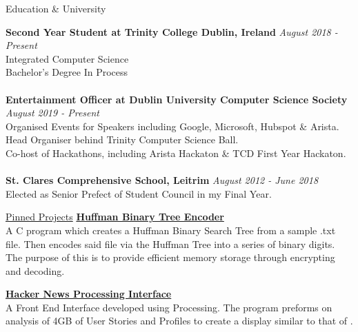 \documentclass{resume} %
\begin{document}

\begin{rSection}{Education \& University}

{\bf Second Year Student at Trinity College Dublin, Ireland} \hfill {\em August 2018 - Present}
\\ Integrated Computer Science
\\ Bachelor's Degree In Process\\
\\{\bf Entertainment Officer at Dublin University Computer Science Society} {\em August 2019 - Present} 
\\Organised Events for Speakers including Google, Microsoft, Hubspot \& Arista.
\\Head Organiser behind Trinity Computer Science Ball.
\\Co-host of Hackathons, including Arista Hackaton \& TCD First Year Hackaton.
\\
\\{\bf St. Clares Comprehensive School, Leitrim} \hfill {\em August 2012 - June 2018} 
\\ Elected as Senior Prefect of Student Council in my Final Year.


\begin{rSection}{\href{https://github.com/Keaneyjo}{Pinned Projects}} %
\href{https://github.com/Keaneyjo/C-Huffman-Tree-Encoder}{{\bf Huffman Binary Tree Encoder}}\\
A C program which creates a Huffman Binary Search Tree from a sample .txt file. Then encodes said file via the Huffman Tree into a series of binary digits. The purpose of this is to provide efficient memory storage through encrypting and decoding.

\href{https://github.com/Keaneyjo/Hacker-News-Interface}{{\bf Hacker News Processing Interface}}\\ 
A Front End Interface developed using Processing. The program preforms on analysis of 4GB of User Stories and Profiles to create a display similar to that of .


\end{rSection}
\end{rSection}
\end{document}
